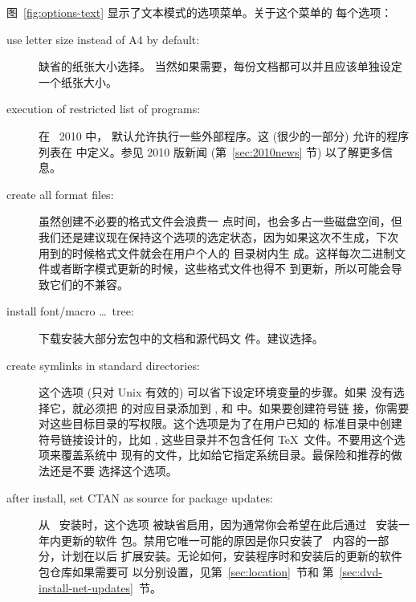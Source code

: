 \documentclass{article}
\begin{document}
图~\ref{fig:options-text} 显示了文本模式的选项菜单。关于这个菜单的
每个选项：

\begin{description}
  \item[use letter size instead of A4 by default:] 缺省的纸张大小选择。
    当然如果需要，每份文档都可以并且应该单独设定一个纸张大小。

  \item[execution of restricted list of programs:] 在 \TL\ 2010 中，
    默认允许执行一些外部程序。这 (很少的一部分) 允许的程序列表在
     中定义。参见 2010 版新闻 (第~\ref{sec:2010news} 节)
    以了解更多信息。

  \item[create all format files:] 虽然创建不必要的格式文件会浪费一
    点时间，也会多占一些磁盘空间，但
    我们还是建议现在保持这个选项的选定状态，因为如果这次不生成，下次
    用到的时候格式文件就会在用户个人的  目录树内生
    成。这样每次二进制文件或者断字模式更新的时候，这些格式文件也得不
    到更新，所以可能会导致它们的不兼容。

  \item[install font/macro \ldots\ tree:] 下载安装大部分宏包中的文档和源代码文
    件。建议选择。

  \item[create symlinks in standard directories:]
    这个选项 (只对 Unix 有效的) 可以省下设定环境变量的步骤。如果
    没有选择它，就必须把 \TL{} 的对应目录添加到 ,
     和  中。如果要创建符号链
    接，你需要对这些目标目录的写权限。这个选项是为了在用户已知的
    标准目录中创建符号链接设计的，比如 ,
    这些目录并不包含任何 \TeX\ 文件。不要用这个选项来覆盖系统中
    现有的文件，比如给它指定系统目录。最保险和推荐的做法还是不要
    选择这个选项。

  \item[after install, set CTAN as source for package updates:]
    从 \DVD\ 安装时，这个选项
    被缺省启用，因为通常你会希望在此后通过 \CTAN\ 安装一年内更新的软件
    包。禁用它唯一可能的原因是你只安装了 \DVD\ 内容的一部分，计划在以后
    扩展安装。无论如何，安装程序时和安装后的更新的软件包仓库如果需要可
    以分别设置，见第~\ref{sec:location}~节和
    第~\ref{sec:dvd-install-net-updates}~节。
\end{description}
\end{document}

